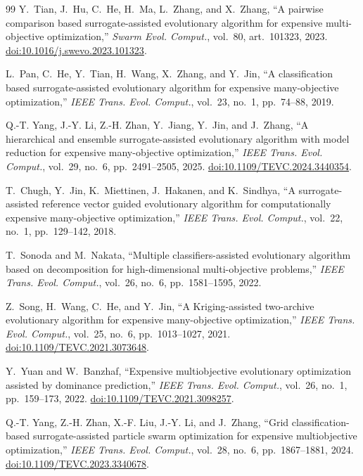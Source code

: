 \documentclass[final,5p,times,twocolumn]{elsarticle}
\begin{document}
\begin{thebibliography}{99}
Y.~Tian, J.~Hu, C.~He, H.~Ma, L.~Zhang, and X.~Zhang,
``A pairwise comparison based surrogate-assisted evolutionary algorithm for
expensive multi-objective optimization,''
\emph{Swarm Evol. Comput.}, vol.~80, art.~101323, 2023.
\href{https://doi.org/10.1016/j.swevo.2023.101323}{doi:10.1016/j.swevo.2023.101323}.

L.~Pan, C.~He, Y.~Tian, H.~Wang, X.~Zhang, and Y.~Jin,
``A classification based surrogate-assisted evolutionary algorithm for
expensive many-objective optimization,''
\emph{IEEE Trans. Evol. Comput.}, vol.~23, no.~1, pp.~74--88, 2019.

Q.-T. Yang, J.-Y. Li, Z.-H. Zhan, Y.~Jiang, Y.~Jin, and J.~Zhang,
``A hierarchical and ensemble surrogate-assisted evolutionary algorithm
with model reduction for expensive many-objective optimization,''
\emph{IEEE Trans. Evol. Comput.}, vol.~29, no.~6, pp.~2491--2505, 2025.
\href{https://doi.org/10.1109/TEVC.2024.3440354}{doi:10.1109/TEVC.2024.3440354}.

T.~Chugh, Y.~Jin, K.~Miettinen, J.~Hakanen, and K.~Sindhya,
``A surrogate-assisted reference vector guided evolutionary algorithm for
computationally expensive many-objective optimization,''
\emph{IEEE Trans. Evol. Comput.}, vol.~22, no.~1, pp.~129--142, 2018.

T.~Sonoda and M.~Nakata,
``Multiple classifiers-assisted evolutionary algorithm based on decomposition
for high-dimensional multi-objective problems,''
\emph{IEEE Trans. Evol. Comput.}, vol.~26, no.~6, pp.~1581--1595, 2022.

Z.~Song, H.~Wang, C.~He, and Y.~Jin,
``A Kriging-assisted two-archive evolutionary algorithm for expensive
many-objective optimization,'' \emph{IEEE Trans. Evol. Comput.}, vol.~25,
no.~6, pp.~1013--1027, 2021.
\href{https://doi.org/10.1109/TEVC.2021.3073648}{doi:10.1109/TEVC.2021.3073648}.

Y.~Yuan and W.~Banzhaf,
``Expensive multiobjective evolutionary optimization assisted by dominance
prediction,'' \emph{IEEE Trans. Evol. Comput.}, vol.~26, no.~1,
pp.~159--173, 2022.
\href{https://doi.org/10.1109/TEVC.2021.3098257}{doi:10.1109/TEVC.2021.3098257}.

Q.-T. Yang, Z.-H. Zhan, X.-F. Liu, J.-Y. Li, and J.~Zhang,
``Grid classification-based surrogate-assisted particle swarm optimization
for expensive multiobjective optimization,'' \emph{IEEE Trans. Evol.
Comput.}, vol.~28, no.~6, pp.~1867--1881, 2024.
\href{https://doi.org/10.1109/TEVC.2023.3340678}{doi:10.1109/TEVC.2023.3340678}.


\end{thebibliography}
\end{document}
